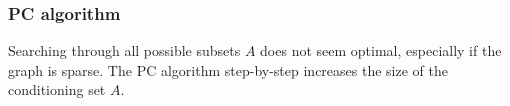 \documentclass{beamer}
\begin{document}
\begin{frame}
    \frametitle{PC algorithm}
    \begin{flushleft}
        Searching through all possible subsets $A$ does not seem optimal, especially if
        the graph is sparse. The PC algorithm step-by-step increases the size of the conditioning
        set $A$.
    \end{flushleft}
\end{frame}
\end{document}
